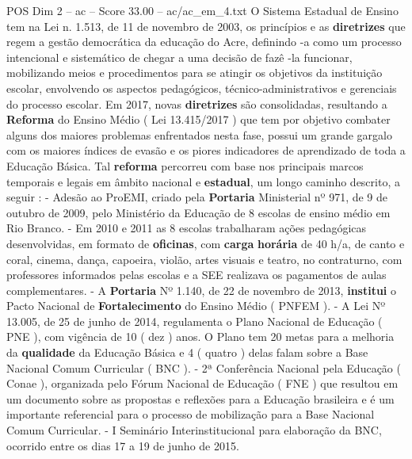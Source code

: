 \begin{textsample}{POS Dim 2 – ac – Score 33.00 – ac/ac\_em\_4.txt}
O Sistema Estadual de Ensino tem na Lei n. 1.513, de 11 de novembro de 2003, os princípios e as \textbf{diretrizes} que regem a gestão democrática da educação do Acre, definindo -a como um processo intencional e sistemático de chegar a uma decisão de fazê -la funcionar, mobilizando meios e procedimentos para se atingir os objetivos da instituição escolar, envolvendo os aspectos pedagógicos, técnico-administrativos e gerenciais do processo escolar.
Em 2017, novas \textbf{diretrizes} são consolidadas, resultando a \textbf{Reforma} do Ensino Médio ( Lei 13.415/2017 ) que tem por objetivo combater alguns dos maiores problemas enfrentados nesta fase, possui um grande gargalo com os maiores índices de evasão e os piores indicadores de aprendizado de toda a Educação Básica.
Tal \textbf{reforma} percorreu com base nos principais marcos temporais e legais em âmbito nacional e \textbf{estadual}, um longo caminho descrito, a seguir : - Adesão ao ProEMI, criado pela \textbf{Portaria} Ministerial nº 971, de 9 de outubro de 2009, pelo Ministério da Educação de 8 escolas de ensino médio em Rio Branco. - Em 2010 e 2011 as 8 escolas trabalharam ações pedagógicas desenvolvidas, em formato de \textbf{oficinas}, com \textbf{carga} \textbf{horária} de 40 h/a, de canto e coral, cinema, dança, capoeira, violão, artes visuais e teatro, no contraturno, com professores informados pelas escolas e a SEE realizava os pagamentos de aulas complementares. - A \textbf{Portaria} Nº 1.140, de 22 de novembro de 2013, \textbf{institui} o Pacto Nacional de \textbf{Fortalecimento} do Ensino Médio ( PNFEM ). - A Lei Nº 13.005, de 25 de junho de 2014, regulamenta o Plano Nacional de Educação ( PNE ), com vigência de 10 ( dez ) anos.
O Plano tem 20 metas para a melhoria da \textbf{qualidade} da Educação Básica e 4 ( quatro ) delas falam sobre a Base Nacional Comum Curricular ( BNC ). - 2ª Conferência Nacional pela Educação ( Conae ), organizada pelo Fórum Nacional de Educação ( FNE ) que resultou em um documento sobre as propostas e reflexões para a Educação brasileira e é um importante referencial para o processo de mobilização para a Base Nacional Comum Curricular. - I Seminário Interinstitucional para elaboração da BNC, ocorrido entre os dias 17 a 19 de junho de 2015.

\end{textsample}

